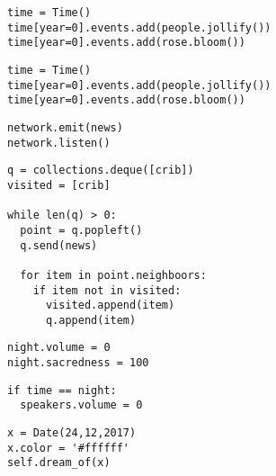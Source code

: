 \documentclass[12pt,a4paper]{article}
\begin{document}
\pagestyle{empty}



\Large

\begin{lstlisting}
time = Time()
time[year=0].events.add(people.jollify())
time[year=0].events.add(rose.bloom())
\end{lstlisting}

\begin{lstlisting}
time = Time()
time[year=0].events.add(people.jollify())
time[year=0].events.add(rose.bloom())
\end{lstlisting}


\begin{lstlisting}
network.emit(news)
network.listen()
\end{lstlisting}

\begin{lstlisting}
q = collections.deque([crib])
visited = [crib]

while len(q) > 0:
  point = q.popleft()
  q.send(news)

  for item in point.neighboors:
    if item not in visited:
      visited.append(item)
      q.append(item)
\end{lstlisting}


\begin{lstlisting}
night.volume = 0
night.sacredness = 100
\end{lstlisting}

\begin{lstlisting}
if time == night:
  speakers.volume = 0
\end{lstlisting}


\begin{lstlisting}
x = Date(24,12,2017)
x.color = '#ffffff'
self.dream_of(x)
\end{lstlisting}
\end{document}

